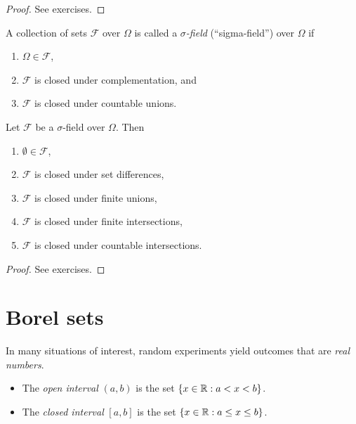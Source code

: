 \begin{proof}
See exercises.
\end{proof}

\break %

\begin{definition}
A collection of sets $\mathcal{F}$ over $\Omega$ is called a \emph{$\sigma$-field} (``sigma-field'') over $\Omega$ if
\begin{enumerate}
\item $\Omega\in\mathcal{F}$,
\item $\mathcal{F}$ is closed under complementation, and
\item $\mathcal{F}$ is closed under countable unions.
\end{enumerate}
\end{definition}

\begin{theorem}\label{thm:properties-of-sigma-fields}
Let $\mathcal{F}$ be a $\sigma$-field over $\Omega$. Then
\begin{enumerate}
\item $\emptyset\in\mathcal{F}$,
\item $\mathcal{F}$ is closed under set differences,
\item $\mathcal{F}$ is closed under finite unions,
\item $\mathcal{F}$ is closed under finite intersections,
\item $\mathcal{F}$ is closed under countable intersections.
\end{enumerate}
\end{theorem}

\begin{proof}
See exercises.
\end{proof}

\section{Borel sets}
In many situations of interest, random experiments yield outcomes that are \emph{real numbers}.

\begin{definition}
\begin{itemize}
\item The \emph{open interval} $(a,b)$ is the set $\{x\in\mathbb{R} : a < x < b\}$.
\item The \emph{closed interval} $[a,b]$ is the set $\{x\in\mathbb{R} : a\leq x\leq b\}$.
\end{itemize}
\end{definition}

